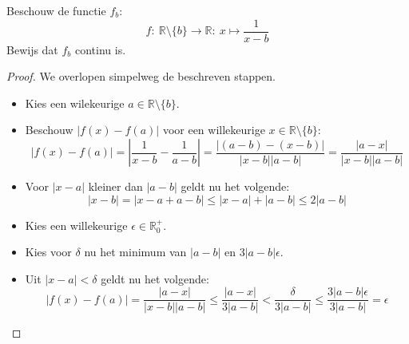 \documentclass[main.tex]{subfiles}
\begin{document}
Beschouw de functie $f_{b}$:
\[ f:\ \mathbb{R}\setminus \{ b \} \rightarrow \mathbb{R}:\ x \mapsto \frac{1}{x-b} \]
Bewijs dat $f_{b}$ continu is.

\begin{proof}
  We overlopen simpelweg de beschreven stappen.
  \begin{itemize}
  \item Kies een wilekeurige $a \in \mathbb{R}\setminus \{ b \}$.
  \item Beschouw $|f(x)-f(a)|$ voor een willekeurige $x \in \mathbb{R}\setminus \{ b \}$:
    \[ |f(x)-f(a)| = \left|\frac{1}{x-b} - \frac{1}{a-b}\right| = \frac{|(a-b) - (x-b)|}{|x-b||a-b|} = \frac{|a-x|}{|x-b||a-b|} \]
  \item Voor $|x-a|$ kleiner dan $|a-b|$ geldt nu het volgende:
    \[ |x-b| = |x-a+a-b| \le |x-a|+|a-b| \le 2|a-b| \]
  \item Kies een willekeurige $\epsilon \in \mathbb{R}_{0}^{+}$.
  \item Kies voor $\delta$ nu het minimum van $|a-b|$ en $3|a-b|\epsilon$.
  \item Uit $|x-a| < \delta$ geldt nu het volgende:
    \[ |f(x)-f(a)| = \frac{|a-x|}{|x-b||a-b|} \le \frac{|a-x|}{3|a-b|} < \frac{\delta}{3|a-b|} \le \frac{3|a-b|\epsilon}{3|a-b|} = \epsilon \]
  \end{itemize}
\end{proof}
\end{document}
